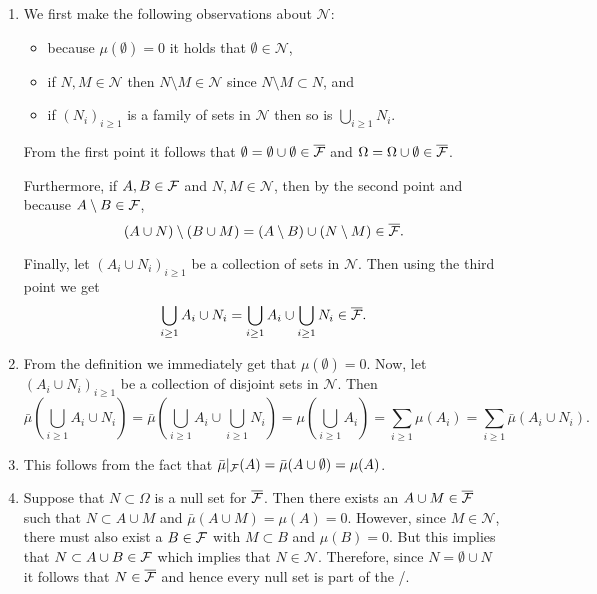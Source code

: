 \documentclass{lecturenotes}
\begin{document}
\begin{enumerate}[label=(\alph*)]
\item We first make the following observations about $\mathcal{N}$:
\begin{itemize}
\item because $\mu(\emptyset) = 0$ it holds that $\emptyset \in \mathcal{N}$,
\item if $N, M \in \mathcal{N}$ then $N \setminus M \in \mathcal{N}$ since $N \setminus M \subset N$, and
\item if $(N_i)_{i \ge 1}$ is a family of sets in $\mathcal{N}$ then so is $\bigcup_{i \ge 1} N_i$.
\end{itemize}

From the first point it follows that $\emptyset = \emptyset \cup \emptyset \in \overline{\mathcal F}$ and $\Omega = \Omega \cup \emptyset \in \overline{\mathcal F}$.

Furthermore, if $A, B \in \mathcal F$ and $N, M \in \mathcal{N}$, then by the second point and because $A \setminus B \in \mathcal F$,
\[
	(A \cup N) \setminus (B \cup M) = (A \setminus B) \cup (N \setminus M) \in \overline{\mathcal F}.
\]

Finally, let $(A_i \cup N_i)_{i \ge 1}$ be a collection of sets in $\mathcal{N}$. Then using the third point we get
\[
	\bigcup_{i \ge 1} A_i \cup N_i = \bigcup_{i \ge 1} A_i \cup \bigcup_{i \ge 1} N_i \in \overline{\mathcal F}.
\]
\item From the definition we immediately get that $\mu(\emptyset) = 0$. Now, let $(A_i \cup N_i)_{i \ge 1}$ be a collection of disjoint sets in $\mathcal{N}$. Then
\[
	\bar{\mu}(\bigcup_{i \ge 1} A_i \cup N_i) = \bar{\mu}(\bigcup_{i \ge 1} A_i \cup \bigcup_{i \ge 1} N_i)
	= \mu(\bigcup_{i \ge 1} A_i) = \sum_{i \ge 1} \mu(A_i) = \sum_{i \ge 1} \bar{\mu}(A_i \cup N_i).
\]
\item This follows from the fact that $\bar{\mu}|_{\mathcal F}(A) = \bar{\mu}(A \cup \emptyset) = \mu(A)$.
\item Suppose that $N \subset \Omega$ is a null set for $\overline{\mathcal F}$. Then there exists an $A \cup M \in \overline{\mathcal F}$ such that $N \subset A \cup M$ and $\bar{\mu}(A \cup M) = \mu(A) = 0$. However, since $M \in \mathcal{N}$, there must also exist a $B \in \mathcal F$ with $M \subset B$ and $\mu(B) = 0$. But this implies that $N \subset A \cup B \in \mathcal F$ which implies that $N \in \mathcal{N}$. Therefore, since $N = \emptyset \cup N$ it follows that $N \in \overline{\mathcal F}$ and hence every null set is part of the \sigalg/.
\end{enumerate}
\end{document}
